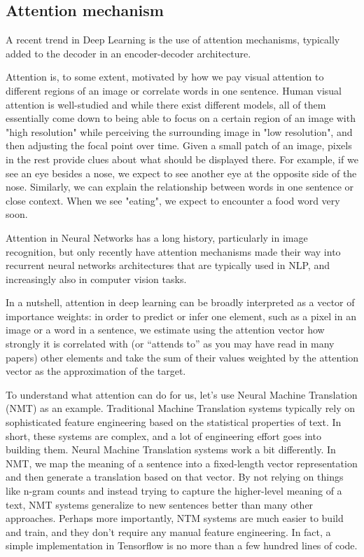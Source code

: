 \subsection{Attention mechanism}

A recent trend in Deep Learning is the use of attention mechanisms, typically added to the decoder in an encoder-decoder architecture. 

Attention is, to some extent, motivated by how we pay visual attention to different regions of an image or correlate words in one sentence. Human visual attention is well-studied and while there exist different models, all of them essentially come down to being able to focus on a certain region of an image with "high resolution" while perceiving the surrounding image in "low resolution", and then adjusting the focal point over time. Given a small patch of an image, pixels in the rest provide clues about what should be displayed there. For example, if we see an eye besides a nose, we expect to see another eye at the opposite side of the nose. Similarly, we can explain the relationship between words in one sentence or close context. When we see "eating", we expect to encounter a food word very soon. 

Attention in Neural Networks has a long history, particularly in image recognition, but only recently have attention mechanisms made their way into recurrent neural networks architectures that are typically used in NLP, and increasingly also in computer vision tasks.

In a nutshell, attention in deep learning can be broadly interpreted as a vector of importance weights: in order to predict or infer one element, such as a pixel in an image or a word in a sentence, we estimate using the attention vector how strongly it is correlated with (or “attends to” as you may have read in many papers) other elements and take the sum of their values weighted by the attention vector as the approximation of the target.


To understand what attention can do for us, let’s use Neural Machine Translation (NMT) as an example. Traditional Machine Translation systems typically rely on sophisticated feature engineering based on the statistical properties of text. In short, these systems are complex, and a lot of engineering effort goes into building them. Neural Machine Translation systems work a bit differently. In NMT, we map the meaning of a sentence into a fixed-length vector representation and then generate a translation based on that vector. By not relying on things like n-gram counts and instead trying to capture the higher-level meaning of a text, NMT systems generalize to new sentences better than many other approaches. Perhaps more importantly, NTM systems are much easier to build and train, and they don’t require any manual feature engineering. In fact, a simple implementation in Tensorflow is no more than a few hundred lines of code.

